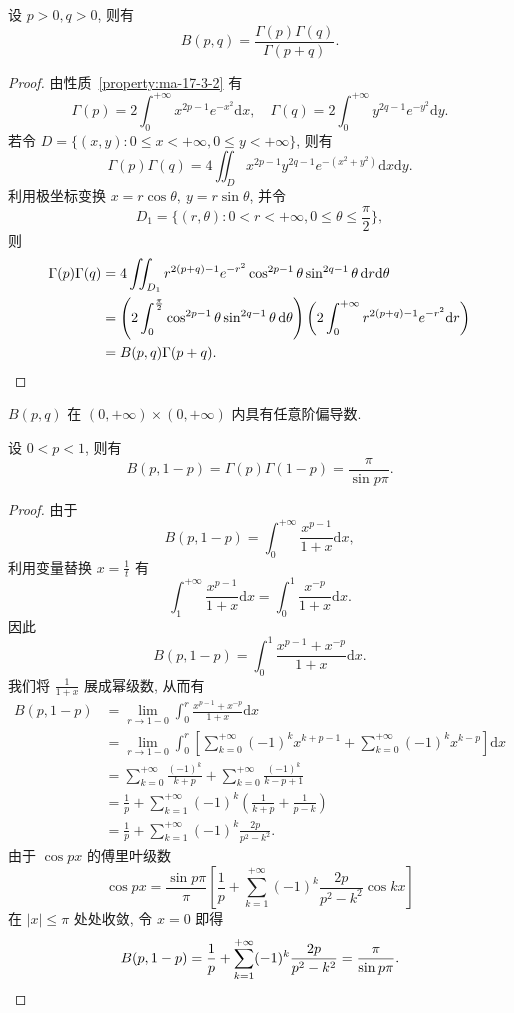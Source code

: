 \begin{theorem}\label{theorem:ma-17-3-7}
设 $p>0,q>0$, 则有
\[
  B(p,q)=\frac{\Gamma(p)\Gamma(q)}{\Gamma(p+q)}.
\]
\end{theorem}


\begin{proof}
由性质~\ref{property:ma-17-3-2} 有
\[
  \Gamma(p)=2\int_0^{+\infty}x^{2p-1}e^{-x^2}\mathrm dx,\quad
  \Gamma(q)=2\int_0^{+\infty}y^{2q-1}e^{-y^2}\mathrm dy.
\]
若令 $D=\{(x,y):0\leqslant x<+\infty,0\leqslant y<+\infty\}$, 则有
\[
  \Gamma(p)\Gamma(q)
  =4\iint_D x^{2p-1}y^{2q-1}e^{-(x^2+y^2)}\mathrm dx\mathrm dy.
\]
利用极坐标变换 $x=r\cos\theta,\ y=r\sin\theta$, 并令
\[
  D_1=\{(r,\theta):0<r<+\infty,0\leqslant\theta\leqslant\frac\pi2\},
\]
则
\[
\begin{aligned}
  \Gamma(p)\Gamma(q)
  &=4\iint_{D_1}r^{2(p+q)-1}e^{-r^2}
    \cos^{2p-1}\theta\sin^{2q-1}\theta\,\mathrm dr\mathrm d\theta\\
  &=
  \left(2\int_0^{\frac\pi2}\cos^{2p-1}\theta\sin^{2q-1}\theta\,\mathrm d\theta\right)
  \left(2\int_0^{+\infty}r^{2(p+q)-1}e^{-r^2}\mathrm dr\right)\\
  &=B(p,q)\Gamma(p+q).
\end{aligned}
\qedhere
\]
\end{proof}


\begin{corollary}\label{corollary:ma-17-source-56}
$B(p,q)$ 在 $(0,+\infty)\times(0,+\infty)$ 内具有任意阶偏导数.
\end{corollary}


\begin{theorem}[{余元公式}]\label{theorem:ma-17-3-8}
设 $0<p<1$, 则有
\[
  B(p,1-p)=\Gamma(p)\Gamma(1-p)=\frac{\pi}{\sin p\pi}.
\]
\end{theorem}


\begin{proof}
由于
\[
  B(p,1-p)=\int_0^{+\infty}\frac{x^{p-1}}{1+x}\mathrm dx,
\]
利用变量替换 $x=\frac1t$ 有
\[
  \int_1^{+\infty}\frac{x^{p-1}}{1+x}\mathrm dx
  =\int_0^1\frac{x^{-p}}{1+x}\mathrm dx.
\]
因此
\[
  B(p,1-p)=\int_0^1\frac{x^{p-1}+x^{-p}}{1+x}\mathrm dx.
\]
我们将 $\frac1{1+x}$ 展成幂级数, 从而有
\[
\begin{aligned}
  B(p,1-p)
  &=\lim_{r\to1-0}\int_0^r\frac{x^{p-1}+x^{-p}}{1+x}\mathrm dx\\
  &=\lim_{r\to1-0}\int_0^r
  \left[\sum_{k=0}^{+\infty}(-1)^k x^{k+p-1}
  +\sum_{k=0}^{+\infty}(-1)^k x^{k-p}\right]\mathrm dx\\
  &=\sum_{k=0}^{+\infty}\frac{(-1)^k}{k+p}
  +\sum_{k=0}^{+\infty}\frac{(-1)^k}{k-p+1}\\
  &=\frac1p+\sum_{k=1}^{+\infty}(-1)^k
  \left(\frac1{k+p}+\frac1{p-k}\right)\\
  &=\frac1p+\sum_{k=1}^{+\infty}(-1)^k\frac{2p}{p^2-k^2}.
\end{aligned}
\]
由于 $\cos px$ 的傅里叶级数
\[
  \cos px=\frac{\sin p\pi}{\pi}
  \left[\frac1p+\sum_{k=1}^{+\infty}(-1)^k\frac{2p}{p^2-k^2}\cos kx\right]
\]
在 $|x|\leqslant\pi$ 处处收敛, 令 $x=0$ 即得
\[
  B(p,1-p)=\frac1p+\sum_{k=1}^{+\infty}(-1)^k\frac{2p}{p^2-k^2}
  =\frac{\pi}{\sin p\pi}.
\qedhere
\]
\end{proof}


